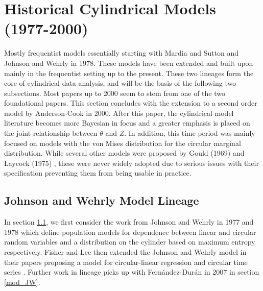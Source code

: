 \section{Historical Cylindrical Models (1977-2000)}\label{hist_sec}

Mostly frequentist models essentially starting with Mardia and Sutton \cite{mardia_model_1978} and Johnson and Wehrly \cite{johnson_angular-linear_1978} in 1978. These models have been extended and built upon mainly in the frequentist setting up to the present. These two lineages form the core of cylindrical data analysis, and will be the basis of the following two subsections. Most papers up to 2000 seem to stem from one of the two foundational papers. This section concludes with the extension to a second order model by Anderson-Cook \cite{anderson-cook_second_2000} in 2000. After this paper, the cylindrical model literature becomes more Bayesian in focus and a greater emphasis is placed on the joint relationship between $\theta$ and $Z$. In addition, this time period was mainly focused on models with the von Mises distribution for the circular marginal distribution. While several other models were proposed by Gould (1969) \cite{gould_regression_1969} and Laycock (1975) \cite{laycock_optimal_1975}, these were never widely adopted due to serious issues with their specification preventing them from being usable in practice.

\subsection{Johnson and Wehrly Model Lineage}\label{hist_JW}

In section \ref{hist_JW}, we first consider the work from Johnson and Wehrly in 1977 \cite{johnson_measures_1977} and 1978 \cite{johnson_angular-linear_1978} which define population models for dependence between linear and circular random variables and a distribution on the cylinder based on maximum entropy respectively. Fisher and Lee then extended the Johnson and Wehrly model in their papers proposing a model for circular-linear regression and circular time series \cite{fisher_regression_1992} \cite{fisher_time_1994}. Further work in lineage picks up with Fern\'{a}ndez-Dur\'{a}n in 2007 \cite{fernandez-duran_models_2007} in section \ref{mod_JW}. 

